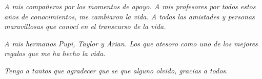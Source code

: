 \begin{acknowledgements}
\begin{flushleft}
{		\emph{	A mis compañeros por los momentos de apoyo. A mis profesores por todos estos años de conocimientos, me cambiaron la vida. A todas las amistades y personas maravillosas que conocí en el transcurso de la vida.}
			\newline
			
		\emph{	A mis hermanos Pupi, Taylor y Arian. Los que atesoro como uno de los mejores regalos que me ha hecho la vida.}
			\newline
			
		\emph{Tengo a tantos que agradecer que se que alguno olvido, gracias a todos.}}

	\end{flushleft}

   
   
   
  
 
  
   
   
  
   
\end{acknowledgements}